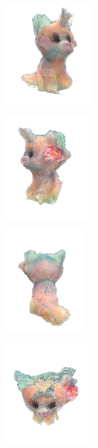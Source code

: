\begin{figure}[h]
    \centering
    \begin{subfigure}[t]{0.2\textheight}
    	\centering
        \includegraphics[height=4.5cm]{archivos/experimentacion-3-resultado-nube.png}
    \end{subfigure}
    \begin{subfigure}[t]{0.2\textheight}
    	\centering
        \includegraphics[height=4.5cm]{archivos/experimentacion-3-resultado-nube-2.png}
    \end{subfigure}
    \begin{subfigure}[t]{0.2\textheight}
    	\centering
        \includegraphics[height=4.5cm]{archivos/experimentacion-3-resultado-nube-3.png}
    \end{subfigure}
    \begin{subfigure}[t]{0.2\textheight}
    	\centering
        \includegraphics[height=4.5cm]{archivos/experimentacion-3-resultado-nube-4.png}

\end{subfigure}
\end{figure}
